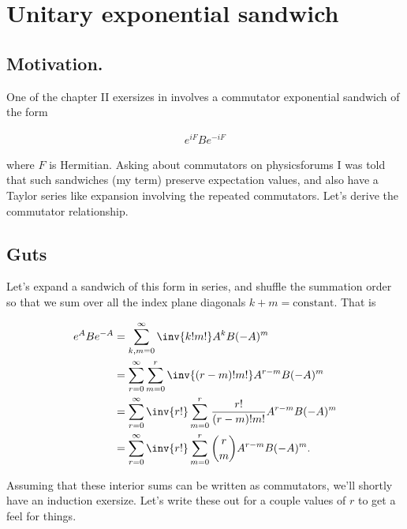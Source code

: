 
%

\chapter{Unitary exponential sandwich}
\label{chap:exponentialSandwichCommutator}
{}
\date{Sept 27, 2010}

\beginArtNoToc

\section{Motivation.}

One of the chapter II exersizes in \cite{desai2009quantum} involves a commutator exponential sandwich of the form

\begin{align}\label{eqn:exponentialSandwichCommutator:1}
e^{i F} B e^{-iF}
\end{align}

where $F$ is Hermitian.  Asking about commutators on physicsforums I was told that such sandwiches (my term) preserve expectation values, and also have a Taylor series like expansion involving the repeated commutators.  Let's derive the commutator relationship.

\section{Guts}

Let's expand a sandwich of this form in series, and shuffle the summation order so that we sum over all the index plane diagonals $k + m = \text{constant}$.  That is

\begin{align*}
e^{A} B e^{-A}
&=
\sum_{k,m=0}^\infty \inv{k!m!} A^k B (-A)^m \\
&=
\sum_{r=0}^\infty \sum_{m=0}^r \inv{(r-m)!m!} A^{r-m} B (-A)^m \\
&=
\sum_{r=0}^\infty \inv{r!} \sum_{m=0}^r \frac{r!}{(r-m)!m!} A^{r-m} B (-A)^m \\
&=
\sum_{r=0}^\infty \inv{r!} \sum_{m=0}^r \binom{r}{m} A^{r-m} B (-A)^m.
\end{align*}

Assuming that these interior sums can be written as commutators, we'll shortly have an induction exersize.  Let's write these out for a couple values of $r$ to get a feel for things.

